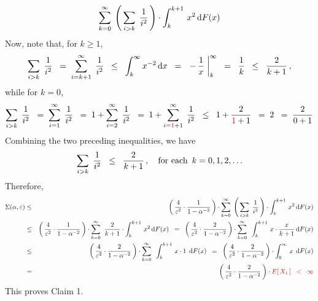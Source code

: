 \begin{enumerate}
\begin{eqnarray*}
	\overset{\infty}{\underset{k=0}{\sum}}\;
	\left(\,\underset{i > k}{\sum}\;\, \dfrac{1}{i^{2}}\,\right) \cdot
	\int_{k}^{k+1}\, x^{2} \,\textnormal{d} F(x)
\end{eqnarray*}
Now, note that, for $k \geq 1$,
\begin{equation*}
\underset{i > k}{\sum}\;\, \dfrac{1}{i^{2}}
\;\; = \;
	\overset{\infty}{\underset{i = k+1}{\sum}}\;\, \dfrac{1}{i^{2}}
\;\; \leq \;\;
	\int_{k}^{\infty}x^{-2}\,\textnormal{d} x
\;\; = \;\;
	\left. -\,\dfrac{1}{x}\;\right\vert_{k}^{\infty}
\;\; = \;\;
	\dfrac{1}{k}
\;\; \leq \;\;
	\dfrac{2}{k+1}\,,
\end{equation*}
while for $k = 0$,
\begin{equation*}
\underset{i > k}{\sum}\;\, \dfrac{1}{i^{2}}
\;\; = \;
	\overset{\infty}{\underset{i = 1}{\sum}}\;\, \dfrac{1}{i^{2}}
\;\; = \;
	1 + \overset{\infty}{\underset{i = 2}{\sum}}\;\, \dfrac{1}{i^{2}}
\;\; = \;
	1 + \overset{\infty}{\underset{i = {\color{red}1}+1}{\sum}}\;\, \dfrac{1}{i^{2}}
\;\; \leq \;\;
	1 + \dfrac{2}{{\color{red}1}+1}
\;\; = \;
	2
\;\; = \;
	\dfrac{2}{0 + 1}
\end{equation*}
Combining the two preceding inequalities, we have
\begin{equation*}
\underset{i > k}{\sum}\;\, \dfrac{1}{i^{2}}
\;\; \leq \;\;
	\dfrac{2}{k + 1}\,,
\quad\textnormal{for each \,$k = 0, 1, 2, \ldots$}
\end{equation*}
Therefore,
\begin{eqnarray*}
\Sigma(\alpha,\varepsilon)
& \leq &
	\left(\,\dfrac{4}{\varepsilon^{2}} \cdot \dfrac{1}{1-\alpha^{-2}}\,\right) \cdot
	\overset{\infty}{\underset{k=0}{\sum}}\;
	\left(\,\underset{i > k}{\sum}\;\, \dfrac{1}{i^{2}}\,\right) \cdot
	\int_{k}^{k+1}\, x^{2} \,\textnormal{d} F(x)
\\
& \leq &
	\left(\,\dfrac{4}{\varepsilon^{2}} \cdot \dfrac{1}{1-\alpha^{-2}}\,\right) \cdot
		\overset{\infty}{\underset{k=0}{\sum}}\;\;
		\dfrac{2}{k+1} \cdot
		\int_{k}^{k+1}\, x^{2} \,\textnormal{d} F(x)
	\;\; = \;\;
		\left(\,\dfrac{4}{\varepsilon^{2}} \cdot \dfrac{2}{1-\alpha^{-2}}\,\right) \cdot
		\overset{\infty}{\underset{k=0}{\sum}}\;\;
		\int_{k}^{k+1}\, x \cdot \dfrac{x}{k+1} \,\textnormal{d} F(x)
\\
& \leq &
	\left(\,\dfrac{4}{\varepsilon^{2}} \cdot \dfrac{2}{1-\alpha^{-2}}\,\right) \cdot
	\overset{\infty}{\underset{k=0}{\sum}}\;\;
	\int_{k}^{k+1}\, x \cdot 1 \;\,\textnormal{d} F(x)
	\;\; = \;\;
	\left(\,\dfrac{4}{\varepsilon^{2}} \cdot \dfrac{2}{1-\alpha^{-2}}\,\right) \cdot
	\int_{0}^{\infty}\, x \;\,\textnormal{d} F(x)
\\
& = &
		\left(\,\dfrac{4}{\varepsilon^{2}} \cdot \dfrac{2}{1-\alpha^{-2}}\,\right) \cdot {\color{red}E\!\left[\,X_{1}\,\right]
	\;\; < \;\;
		\infty}
\end{eqnarray*}
This proves Claim 1.


\end{enumerate}
